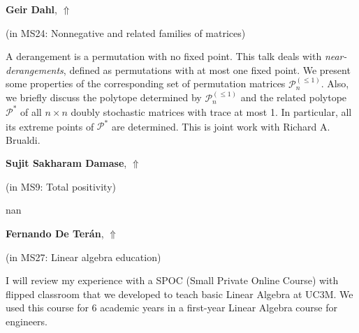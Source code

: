 \documentclass[ILAS2025-program.tex]{subfiles}
\begin{document}
     \hypertarget{down0200}{}\begin{ilasabstract}
    
    \textbf{Geir Dahl},  \hfill \hyperlink{up0200}{$\Uparrow$}
    
    (in {\color{mstitle}MS24: Nonnegative and related families of matrices})
        
        \mtskip
    A derangement is a permutation with no fixed point. This talk deals with  {\em near-derangements}, defined as permutations with at most one fixed point. We present some properties of  the corresponding set of permutation matrices $\mathcal{P}^{(\le 1)}_n$. 
  Also, we briefly discuss  the polytope determined by $\mathcal{P}^{(\le 1)}_n$ and the related polytope $\mathcal{P}^*$ of  all $n\times n$  doubly stochastic matrices with trace at most 1.
  In particular, all its  extreme points of $\mathcal{P}^*$ are determined. 
This is joint work with Richard A. Brualdi.
\end{ilasabstract}
     \hypertarget{down0121}{}\begin{ilasabstract}
    
    \textbf{Sujit Sakharam Damase},  \hfill \hyperlink{up0121}{$\Uparrow$}
    
    (in {\color{mstitle}MS9: Total positivity})
        
        \mtskip
    nan\end{ilasabstract}
     \hypertarget{down0259}{}\begin{ilasabstract}
    
    \textbf{Fernando De Terán},  \hfill \hyperlink{up0259}{$\Uparrow$}
    
    (in {\color{mstitle}MS27: Linear algebra education})
        
        \mtskip
    I will review my experience with a SPOC (Small Private Online Course) with flipped classroom that we developed to teach basic Linear Algebra at UC3M. We used this course for 6 academic years in a first-year Linear Algebra course for engineers.\end{ilasabstract}
\end{document}
